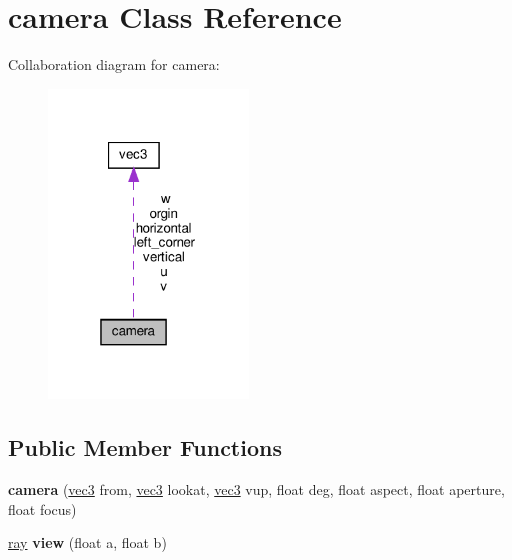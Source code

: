\hypertarget{classcamera}{}\section{camera Class Reference}
\label{classcamera}


Collaboration diagram for camera\+:
\nopagebreak
\begin{figure}[H]
\begin{center}
\leavevmode
\includegraphics[width=151pt]{classcamera__coll__graph}
\end{center}
\end{figure}
\subsection*{Public Member Functions}
\begin{DoxyCompactItemize}
\item 
\mbox{\label{classcamera_acdf970a12643e5ea1c594ff7623942f4}} 
{\bfseries camera} (\hyperlink{classvec3}{vec3} from, \hyperlink{classvec3}{vec3} lookat, \hyperlink{classvec3}{vec3} vup, float deg, float aspect, float aperture, float focus)
\item 
\mbox{\label{classcamera_a8c47e02062b903e907cb0dad2de62211}} 
\hyperlink{classray}{ray} {\bfseries view} (float a, float b)
\end{DoxyCompactItemize}
